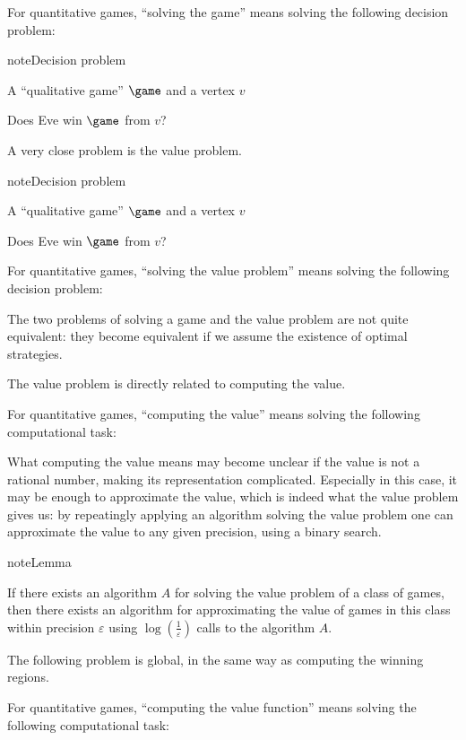 \documentclass[letterpaper,10pt,english]{sphinxmanual}
\begin{document}
For quantitative games, “solving the game” means solving the following
decision problem:

\begin{sphinxadmonition}{note}{Decision problem}

A “qualitative game” \(\game\) and a vertex \(v\)

Does Eve win \(\game\) from \(v\)?
\end{sphinxadmonition}

A very close problem is the value problem.

\begin{sphinxadmonition}{note}{Decision problem}

A “qualitative game” \(\game\) and a vertex \(v\)

Does Eve win \(\game\) from \(v\)?
\end{sphinxadmonition}

For quantitative games, “solving the value problem” means solving the
following decision problem:

The two problems of solving a game and the value problem are not
quite equivalent: they become equivalent if we assume the existence of
optimal strategies.

The value problem is directly related to computing the
value.

For quantitative games, “computing the value” means solving the
following computational task:

What computing the value means may become unclear if the value is
not a rational number, making its representation complicated. Especially
in this case, it may be enough to approximate the value, which is indeed
what the value problem gives us: by repeatingly applying an
algorithm solving the value problem one can approximate the value to any
given precision, using a binary search.

\begin{sphinxadmonition}{note}{Lemma}

If there exists an algorithm \(A\) for solving the value problem of a
class of games, then there exists an algorithm for approximating the
value of games in this class within precision \(\varepsilon\) using
\(\log(\frac{1}{\varepsilon})\) calls to the algorithm \(A\).
\end{sphinxadmonition}

The following problem is global, in the same way as computing the
winning regions.

For quantitative games, “computing the value function” means solving the
following computational task:
\end{document}
